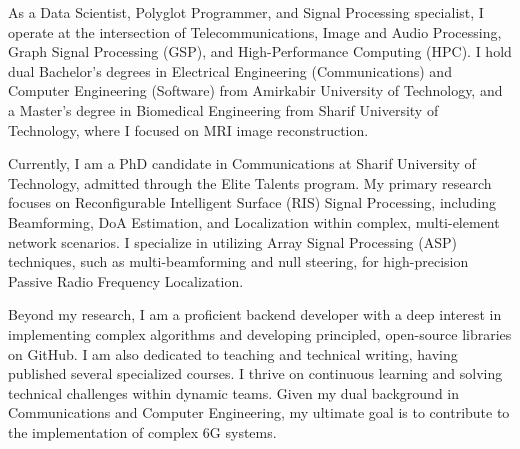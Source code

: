 \documentclass[a4paper,11pt]{article}
\begin{document}
%

\small{
As a Data Scientist, Polyglot Programmer, and Signal Processing specialist, I operate at the intersection of Telecommunications, Image and Audio Processing, Graph Signal Processing (GSP), and High-Performance Computing (HPC). I hold dual Bachelor’s degrees in Electrical Engineering (Communications) and Computer Engineering (Software) from Amirkabir University of Technology, and a Master’s degree in Biomedical Engineering from Sharif University of Technology, where I focused on MRI image reconstruction.

Currently, I am a PhD candidate in Communications at Sharif University of Technology, admitted through the Elite Talents program. My primary research focuses on Reconfigurable Intelligent Surface (RIS) Signal Processing, including Beamforming, DoA Estimation, and Localization within complex, multi-element network scenarios. I specialize in utilizing Array Signal Processing (ASP) techniques, such as multi-beamforming and null steering, for high-precision Passive Radio Frequency Localization.

Beyond my research, I am a proficient backend developer with a deep interest in implementing complex algorithms and developing principled, open-source libraries on GitHub. I am also dedicated to teaching and technical writing, having published several specialized courses. I thrive on continuous learning and solving technical challenges within dynamic teams. Given my dual background in Communications and Computer Engineering, my ultimate goal is to contribute to the implementation of complex 6G systems.
}
\end{document}
